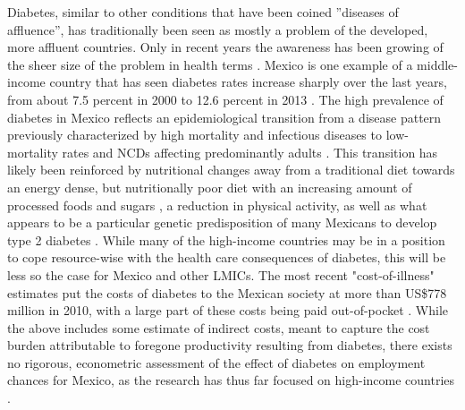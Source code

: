 Diabetes, similar to other conditions that have been coined ''diseases of affluence'', has traditionally been seen as mostly a problem of the developed, more affluent countries. Only in recent
years the awareness has been growing of the sheer size of the problem
in health terms \parencite{Yach2006,Hu2011}. Mexico is one example of
a middle-income country that has seen diabetes rates increase sharply
over the last years, from about 7.5 percent in 2000 \parencite{Barquera2013}
to 12.6 percent in 2013 \parencite{InternationalDiabetesFederation2013}.
The high prevalence of diabetes in Mexico reflects an epidemiological
transition from a disease pattern previously characterized by high
mortality and infectious diseases to low-mortality rates and \acp{NCD}
affecting predominantly adults \parencite{Stevens2008}. This transition
has likely been reinforced by nutritional changes away from a traditional
diet towards an energy dense, but nutritionally poor diet with an
increasing amount of processed foods and sugars \parencite{Barquera2008b,Basu2013,Rivera2004},
a reduction in physical activity, as well as what appears to be a
particular genetic predisposition of many Mexicans to develop type
2 diabetes \parencite{Williams2013}. While many of the high-income countries
may be in a position to cope resource-wise with the health care consequences
of diabetes, this will be less so the case for Mexico and other \acp{LMIC}.
The most recent "cost-of-illness" estimates put the costs of diabetes
to the Mexican society at more than US\$778 million in 2010, with
a large part of these costs being paid out-of-pocket \parencite{A.2011z}.
While the above includes some estimate of indirect costs, meant to
capture the cost burden attributable to foregone productivity resulting
from diabetes, there exists no rigorous, econometric assessment of
the effect of diabetes on employment chances for Mexico, as the research
has thus far focused on high-income countries \parencite{Lin2011b,Latif2009,Brown2005,Minor2011,Bastida2002,Vijan2004,Zhang2009}.

